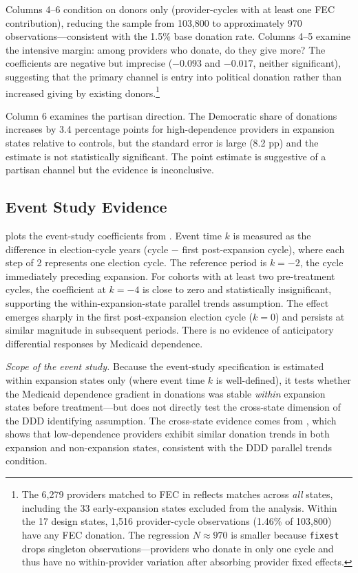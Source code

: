 \documentclass[12pt]{article}
\begin{document}
Columns 4--6 condition on donors only (provider-cycles with at least one FEC contribution), reducing the sample from 103,800 to approximately 970 observations---consistent with the 1.5\% base donation rate. Columns 4--5 examine the intensive margin: among providers who donate, do they give more? The coefficients are negative but imprecise ($-0.093$ and $-0.017$, neither significant), suggesting that the primary channel is entry into political donation rather than increased giving by existing donors.\footnote{The 6,279 providers matched to FEC in  reflects matches across \textit{all} states, including the 33 early-expansion states excluded from the analysis. Within the 17 design states, 1,516 provider-cycle observations (1.46\% of 103,800) have any FEC donation. The regression $N \approx 970$ is smaller because \texttt{fixest} drops singleton observations---providers who donate in only one cycle and thus have no within-provider variation after absorbing provider fixed effects.}

Column 6 examines the partisan direction. The Democratic share of donations increases by 3.4 percentage points for high-dependence providers in expansion states relative to controls, but the standard error is large (8.2 pp) and the estimate is not statistically significant. The point estimate is suggestive of a partisan channel but the evidence is inconclusive.

\subsection{Event Study Evidence}

 plots the event-study coefficients from . Event time $k$ is measured as the difference in election-cycle years (cycle $-$ first post-expansion cycle), where each step of 2 represents one election cycle. The reference period is $k = -2$, the cycle immediately preceding expansion. For cohorts with at least two pre-treatment cycles, the coefficient at $k = -4$ is close to zero and statistically insignificant, supporting the within-expansion-state parallel trends assumption. The effect emerges sharply in the first post-expansion election cycle ($k = 0$) and persists at similar magnitude in subsequent periods. There is no evidence of anticipatory differential responses by Medicaid dependence.

\textit{Scope of the event study.} Because the event-study specification is estimated within expansion states only (where event time $k$ is well-defined), it tests whether the Medicaid dependence gradient in donations was stable \textit{within} expansion states before treatment---but does not directly test the cross-state dimension of the DDD identifying assumption. The cross-state evidence comes from , which shows that low-dependence providers exhibit similar donation trends in both expansion and non-expansion states, consistent with the DDD parallel trends condition.
\end{document}
